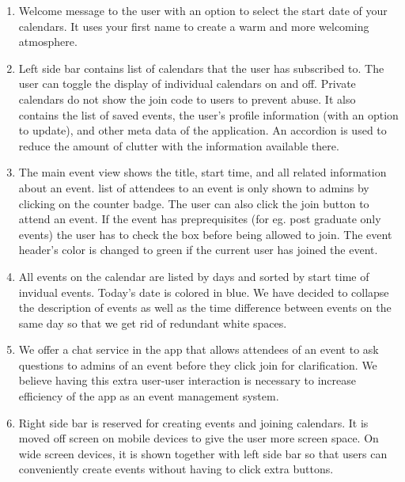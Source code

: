 \documentclass[10pt,a4paper]{article}
\begin{document}
\begin{enumerate}
 \item Welcome message to the user with an option to select the start date of your calendars. It uses your first name to create a warm and more welcoming atmosphere.
 \item Left side bar contains list of calendars that the user has subscribed to. The user can toggle the display of individual calendars on and off. Private calendars do not show the join code to users to prevent abuse. It also contains the list of saved events, the user's profile information (with an option to update), and other meta data of the application. An accordion is used to reduce the amount of clutter with the information available there.
 \item The main event view shows the title, start time, and all related information about an event. list of attendees to an event is only shown to admins by clicking on the counter badge. The user can also click the join button to attend an event. If the event has preprequisites (for eg. post graduate only events) the user has to check the box before being allowed to join. The event header's color is changed to green if the current user has joined the event.
 \item All events on the calendar are listed by days and sorted by start time of invidual events. Today's date is colored in blue. We have decided to collapse the description of events as well as the time difference between events on the same day so that we get rid of redundant white spaces.
 \item We offer a chat service in the app that allows attendees of an event to ask questions to admins of an event before they click join for clarification. We believe having this extra user-user interaction is necessary to increase efficiency of the app as an event management system.
 \item Right side bar is reserved for creating events and joining calendars. It is moved off screen on mobile devices to give the user more screen space. On wide screen devices, it is shown together with left side bar so that users can conveniently create events without having to click extra buttons.
\end{enumerate}
\end{document}
